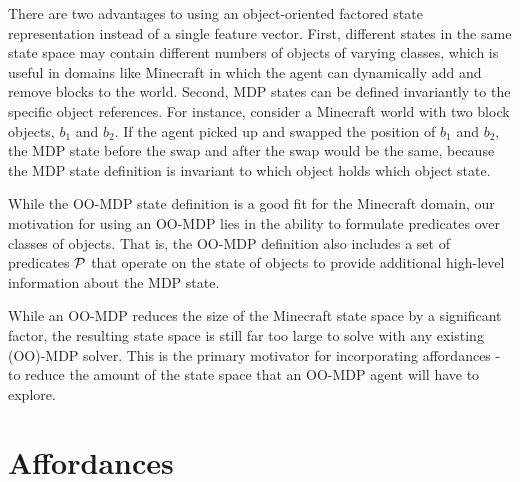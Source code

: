 \documentclass[conference]{IEEEtran}
\begin{document}
There are two advantages to using an object-oriented factored state
representation instead of a single feature vector. First, different
states in the same state space may contain different numbers of
objects of varying classes, which is useful in domains like Minecraft
in which the agent can dynamically add and remove blocks to the
world. Second, MDP states can be defined invariantly to the specific
object references.  For instance, consider a Minecraft world with two
block objects, $b_1$ and $b_2$.  If the agent picked up and swapped
the position of $b_1$ and $b_2$, the MDP state before the swap and
after the swap would be the same, because the MDP state definition is
invariant to which object holds which object state. 

While the OO-MDP state definition is a good fit for the Minecraft
domain, our motivation for using an OO-MDP lies in the ability to
formulate predicates over classes of objects. That is, the OO-MDP
definition also includes a set of predicates ${\cal P}$ that operate
on the state of objects to provide additional high-level information
about the MDP state. 

While an OO-MDP reduces the size of the Minecraft state space
by a significant factor, the resulting state space is still far too large to
solve with any existing (OO)-MDP solver. This is the primary motivator
for incorporating affordances - to reduce the amount of the
state space that an OO-MDP agent will have to explore.

\section{Affordances}
\label{sec:affordances}
\end{document}
